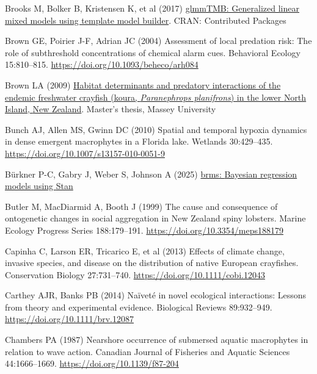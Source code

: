 \documentclass[
  12pt,
  a4paper,
  oneside]{scrbook}
\newlength{\cslhangindent}
\newenvironment{CSLReferences}[2] %
 {\begin{list}{}{%
  \setlength{\itemindent}{0pt}
  \setlength{\leftmargin}{0pt}
  \setlength{\parsep}{0pt}
  \ifodd #1
   \setlength{\leftmargin}{\cslhangindent}
   \setlength{\itemindent}{-1\cslhangindent}
  \fi
  \setlength{\itemsep}{#2\baselineskip}}}
 {\end{list}}
\begin{document}
\begin{CSLReferences}{1}{1}
Brooks M, Bolker B, Kristensen K, et al (2017)
\href{https://doi.org/10.32614/cran.package.glmmtmb}{glmmTMB:
Generalized linear mixed models using template model builder}. CRAN:
Contributed Packages

Brown GE, Poirier J-F, Adrian JC (2004) Assessment of local predation
risk: The role of subthreshold concentrations of chemical alarm cues.
Behavioral Ecology 15:810--815.
\url{https://doi.org/10.1093/beheco/arh084}

Brown LA (2009) \href{http://hdl.handle.net/10179/1168}{Habitat
determinants and predatory interactions of the endemic freshwater
crayfish (koura, {\emph{Paranephrops planifrons}}) in the lower {North
Island}, {New Zealand}}. Master's thesis, Massey University

Bunch AJ, Allen MS, Gwinn DC (2010) Spatial and temporal hypoxia
dynamics in dense emergent macrophytes in a {Florida} lake. Wetlands
30:429--435. \url{https://doi.org/10.1007/s13157-010-0051-9}

Bürkner P-C, Gabry J, Weber S, Johnson A (2025)
\href{https://cran.r-project.org/web/packages/brms/index.html}{{brms}:
{Bayesian} regression models using {Stan}}

Butler M, MacDiarmid A, Booth J (1999) The cause and consequence of
ontogenetic changes in social aggregation in {New Zealand} spiny
lobsters. Marine Ecology Progress Series 188:179--191.
\url{https://doi.org/10.3354/meps188179}

Capinha C, Larson ER, Tricarico E, et al (2013) Effects of climate
change, invasive species, and disease on the distribution of native
{European} crayfishes. Conservation Biology 27:731--740.
\url{https://doi.org/10.1111/cobi.12043}

Carthey AJR, Banks PB (2014) Naïveté in novel ecological interactions:
Lessons from theory and experimental evidence. Biological Reviews
89:932--949. \url{https://doi.org/10.1111/brv.12087}

Chambers PA (1987) Nearshore occurrence of submersed aquatic macrophytes
in relation to wave action. Canadian Journal of Fisheries and Aquatic
Sciences 44:1666--1669. \url{https://doi.org/10.1139/f87-204}


\end{CSLReferences}
\end{document}

